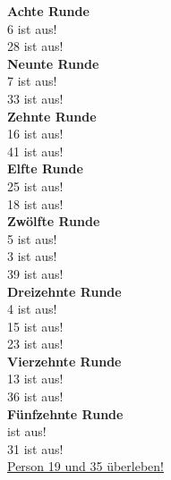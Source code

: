 \documentclass[titlepage]{article}
\newcommand{\n}{\newline}
\begin{document}
\begin{multicols}{3}
				
				\noindent
				\textbf{Achte Runde}\\
				6 ist aus!\\
				28 ist aus!\\
				\n
				\textbf{Neunte Runde}\\
				7 ist aus!\\
				33 ist aus!\\
				\n
				\textbf{Zehnte Runde}\\
				16 ist aus!\\
				41 ist aus!\\
				\n
				\textbf{Elfte Runde}\\
				25 ist aus!\\
				18 ist aus!\\
				\n
				\textbf{Zwölfte Runde}\\
				5 ist aus!\\
				3 ist aus!\\
				39 ist aus!\\
				\n
				\textbf{Dreizehnte Runde}\\
				4 ist aus!\\
				15 ist aus!\\
				23 ist aus!\\
				\n
				\textbf{Vierzehnte Runde}\\
				13 ist aus!\\
				36 ist aus!\\
				\n
				\textbf{Fünfzehnte Runde}\\\n
				22 ist aus!\\
				31 ist aus!\\
				\n
				\underline{\underline{Person 19 und 35 überleben!}}

			\end{multicols}
			\endgroup
		
\end{document}
